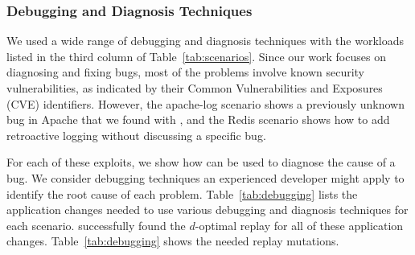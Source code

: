\subsubsection{Debugging and Diagnosis Techniques}
\label{sec:debugging}

We used a wide range of debugging and diagnosis techniques with the
workloads listed in the third column of Table~\ref{tab:scenarios}.
Since our work focuses on diagnosing and fixing bugs,
most of the problems involve known security vulnerabilities,
as indicated by their Common Vulnerabilities and Exposures (CVE) identifiers.
However, the apache-log scenario shows a previously unknown bug in Apache
that we found with {\dora}, and the Redis scenario shows how to add
retroactive logging without discussing a specific bug.

For each of these exploits, we show how {\dora} can be used to diagnose
the cause of a bug. We consider debugging techniques an experienced
developer might apply to identify the root cause of each problem.
Table~\ref{tab:debugging} lists the application changes needed to use various
debugging and diagnosis techniques for each scenario.
{\dora} successfully found the $d$-optimal replay for all of these
application changes. Table~\ref{tab:debugging} shows the needed replay mutations.

